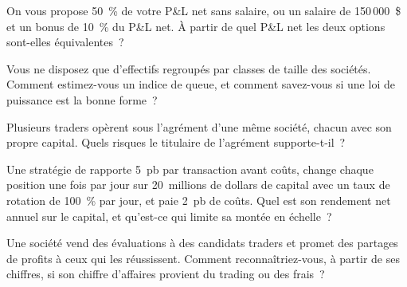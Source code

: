 \begin{interviewq}\label{iq:in:medium-frequency-proprietary-shops:2}
On vous propose 50~\% de votre P\&L net sans salaire, ou un salaire de 150\,000~\$ et un bonus de 10~\% du P\&L net.
À partir de quel P\&L net les deux options sont-elles équivalentes~?
\end{interviewq}

\begin{interviewq}\label{iq:in:medium-frequency-proprietary-shops:3}
Vous ne disposez que d'effectifs regroupés par classes de taille des sociétés. Comment estimez-vous un indice de queue, et
comment savez-vous si une loi de puissance est la bonne forme~?
\end{interviewq}

\begin{interviewq}\label{iq:in:medium-frequency-proprietary-shops:4}
Plusieurs traders opèrent sous l'agrément d'une même société, chacun avec son propre capital. Quels risques le titulaire de l'agrément supporte-t-il~?
\end{interviewq}

\begin{interviewq}\label{iq:in:medium-frequency-proprietary-shops:5}
Une stratégie de  rapporte 5~pb par transaction avant coûts, change chaque position une fois par jour
sur 20~millions de dollars de capital avec un taux de rotation de 100~\% par jour, et paie 2~pb de coûts. Quel est son rendement net
annuel sur le capital, et qu'est-ce qui limite sa montée en échelle~?
\end{interviewq}

\begin{interviewq}\label{iq:in:medium-frequency-proprietary-shops:6}
Une société vend des évaluations à des candidats traders et promet des partages de profits à ceux qui les réussissent.
Comment reconnaîtriez-vous, à partir de ses chiffres, si son chiffre d'affaires provient du trading ou des frais~?
\end{interviewq}
